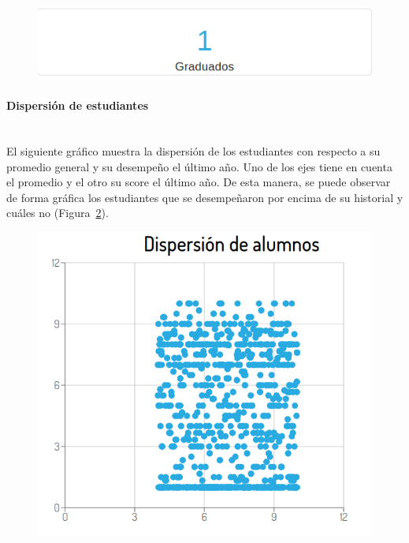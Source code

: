 \begin{figure}[H]
  \centering
    \includegraphics[scale=0.4]{images/seguimiento-academico/sa-graduados.png}
  \label{fig:sa-graduados}
\end{figure}

\paragraph{Dispersión de estudiantes} \mbox{}\\
El siguiente gráfico muestra la dispersión de los estudiantes con respecto a su promedio general y su desempeño el último año. Uno de los ejes tiene en cuenta el promedio y el otro su score el último año. De esta manera, se puede observar de forma gráfica los estudiantes que se desempeñaron por encima de su historial y cuáles no (Figura~\ref{fig:sa-dispersion}).

\begin{figure}[H]
  \centering
    \includegraphics[scale=0.4]{images/seguimiento-academico/sa-dispersion.png}
  \label{fig:sa-dispersion}
\end{figure}


